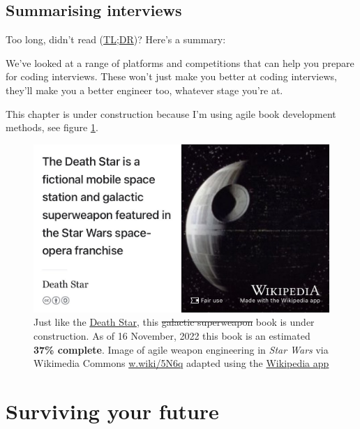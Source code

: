 \documentclass[
]{book}
\begin{document}
\hypertarget{tldr9}{%
\section{Summarising interviews}\label{tldr9}}

Too long, didn't read (\href{https://en.wiktionary.org/wiki/too_long;_didn\%27t_read}{TL;DR})? Here's a summary:

We've looked at a range of platforms and competitions that can help you prepare for coding interviews. These won't just make you better at coding interviews, they'll make you a better engineer too, whatever stage you're at.

This chapter is under construction because I'm using agile book development methods, see figure \ref{fig:deathstar6-fig}.

\begin{figure}

{\centering \includegraphics[width=0.99\linewidth]{images/DeathStar2} 

}

\caption{Just like the \href{https://en.wikipedia.org/wiki/Death_Star}{Death Star}, this \sout{galactic superweapon} book is under construction. As of 16 November, 2022 this book is an estimated \textbf{37\% complete}. Image of agile weapon engineering in \emph{Star Wars} via Wikimedia Commons \href{https://w.wiki/5N6q}{w.wiki/5N6q} adapted using the \href{https://apps.apple.com/gb/app/wikipedia/id324715238}{Wikipedia app}}\label{fig:deathstar6-fig}
\end{figure}

\hypertarget{surviving}{%
\chapter{Surviving your future}\label{surviving}}
\end{document}
